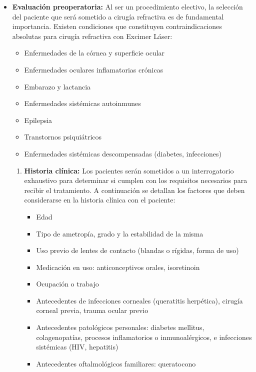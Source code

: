 \begin{itemize}
\begin{itemize}
    \end{itemize}
    \item \textbf{Evaluación preoperatoria: }Al ser un procedimiento electivo, la selección del paciente que será sometido a cirugía refractiva es de fundamental importancia. Existen condiciones que constituyen contraindicaciones absolutas para cirugía refractiva con Excimer Láser:
    \begin{itemize}
        \item Enfermedades de la córnea y superficie ocular
        \item Enfermedades oculares inflamatorias crónicas
        \item Embarazo y lactancia
        \item Enfermedades sistémicas autoinmunes
        \item Epilepsia
        \item Transtornos psiquiátricos
        \item Enfermedades sistémicas descompensadas (diabetes, infecciones)
    \end{itemize}
    \begin{enumerate}
        \item \textbf{Historia clínica: }Los pacientes serán sometidos a un interrogatorio exhaustivo para determinar si cumplen con los requisitos necesarios para recibir el tratamiento. A continuación se detallan los factores que deben considerarse en la historia clínica con el paciente:
        \begin{itemize}
            \item Edad
            \item Tipo de ametropía, grado y la estabilidad de la misma
            \item Uso previo de lentes de contacto (blandas o rígidas, forma de uso)
            \item Medicación en uso: anticonceptivos orales, isoretinoin
            \item Ocupación o trabajo
            \item Antecedentes de infecciones corneales (queratitis herpética), cirugía corneal previa, trauma ocular previo
            \item Antecedentes patológicos personales: diabetes mellitus, colagenopatías, procesos inflamatorios o inmunoalérgicos, e infecciones sistémicas (HIV, hepatitis)
            \item Antecedentes oftalmológicos familiares: queratocono 
        \end{itemize}

\end{enumerate}
\end{itemize}
